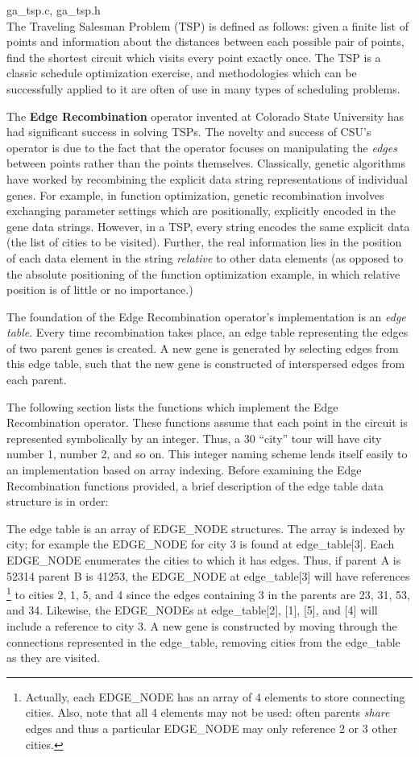 ga\_tsp.c, ga\_tsp.h
\\
The Traveling Salesman Problem (TSP) is defined as follows: given a finite
list of points and information about the distances between each possible
pair of points, find the shortest circuit which visits every point exactly once.
The TSP is a classic schedule optimization exercise, and methodologies which
can be successfully applied to it are often of use in many types of scheduling
problems.  

The {\bf Edge Recombination} operator invented at Colorado State University
has had significant success in solving TSPs.  The novelty and success of CSU's
operator is due to the fact that the operator focuses on manipulating the
{\it edges} between points rather than the points themselves.  Classically,
genetic algorithms have worked by recombining the explicit data string
representations of individual genes.  For example, in function optimization,
genetic recombination involves exchanging parameter settings which are
positionally, explicitly encoded in the gene data strings.  However, in a TSP,
every string encodes the same explicit data (the list of cities to be visited).
Further, the real information lies in the position of each data element in
the string {\it relative} to other data elements (as opposed to the absolute
positioning of the function optimization example, in which relative position
is of little or no importance.)

The foundation of the Edge Recombination operator's implementation is an 
{\it edge table}.  Every time recombination takes place, an edge table
representing the edges of two parent genes is created.  A new gene is 
generated by selecting edges from this edge table, such that the new gene
is constructed of interspersed edges from each parent. 

The following section lists the functions which implement the Edge
Recombination operator.  These functions assume that each point in the
circuit is represented symbolically by an integer.  Thus, a 30 ``city'' tour
will have city number 1, number 2, and so on.  This integer naming scheme
lends itself easily to an implementation based on array indexing.  Before
examining the Edge Recombination functions provided, a brief description
of the edge table data structure is in order:

The edge table is an array of EDGE\_NODE structures.  The array is
indexed by city; for example the EDGE\_NODE for city 3 is found at
edge\_table[3].  Each EDGE\_NODE enumerates the cities to which it
has edges.  Thus, if parent A is 52314 parent B is 41253, the EDGE\_NODE
at edge\_table[3] will have references \footnote{Actually, each EDGE\_NODE
has an array of 4 elements to store connecting cities.  Also, note that
all 4 elements may not be used: often parents {\it share}
edges and thus a particular EDGE\_NODE may only reference 2 or 3 other
cities.} to cities 2, 1, 5, and 4 since the edges containing 3 in the parents
are 23, 31, 53, and 34.  Likewise, the EDGE\_NODEs at edge\_table[2], [1],
[5], and [4] will include a reference to city 3.  A new gene is constructed
by moving through the connections represented in the edge\_table, removing
cities from the edge\_table as they are visited.

